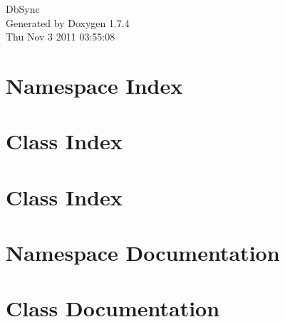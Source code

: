 \documentclass[a4paper]{book}
\begin{document}
\hypersetup{pageanchor=false}
\begin{titlepage}
\vspace*{7cm}
\begin{center}
{\Large DbSync }\\
\vspace*{1cm}
{\large Generated by Doxygen 1.7.4}\\
\vspace*{0.5cm}
{\small Thu Nov 3 2011 03:55:08}\\
\end{center}
\end{titlepage}
\clearemptydoublepage
{}
\tableofcontents
\clearemptydoublepage
{}
\hypersetup{pageanchor=true}
\chapter{Namespace Index}

\chapter{Class Index}

\chapter{Class Index}

\chapter{Namespace Documentation}






\chapter{Class Documentation}















\printindex
\end{document}
